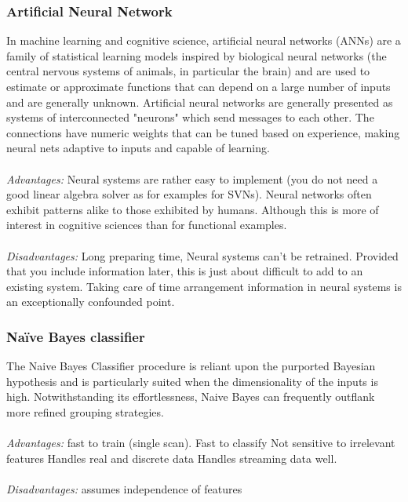 \documentclass[14pt]{extarticle}
\begin{document}
\subsubsection{Artificial Neural Network}
In machine learning and cognitive science, artificial neural networks (ANNs) are a family of statistical learning models inspired by biological neural networks (the central nervous systems of animals, in particular the brain) and are used to estimate or approximate functions that can depend on a large number of inputs and are generally unknown. Artificial neural networks are generally presented as systems of interconnected "neurons" which send messages to each other. The connections have numeric weights that can be tuned based on experience, making neural nets adaptive to inputs and capable of learning.
\\
\\
\emph{Advantages:} Neural systems are rather easy to implement (you do not need a good linear algebra solver as for examples for SVNs). Neural networks often exhibit patterns alike to those exhibited by humans. Although this is more of interest in cognitive sciences than for functional examples.
\\
\\
\emph{Disadvantages:} Long preparing time, Neural systems can't be retrained. Provided that you include information later, this is just about difficult to add to an existing system. Taking care of time arrangement information in neural systems is an exceptionally confounded point.
\\
\subsubsection{Naïve Bayes classifier}
The Naive Bayes Classifier procedure is reliant upon the purported Bayesian hypothesis and is particularly suited when the dimensionality of the inputs is high. Notwithstanding its effortlessness, Naive Bayes can frequently outflank more refined grouping strategies.
\\
\\
\emph{Advantages:} fast to train (single scan). Fast to classify Not sensitive to irrelevant features Handles real and discrete data Handles streaming data well.
\\
\\
\emph{Disadvantages:} assumes independence of features
\end{document}
